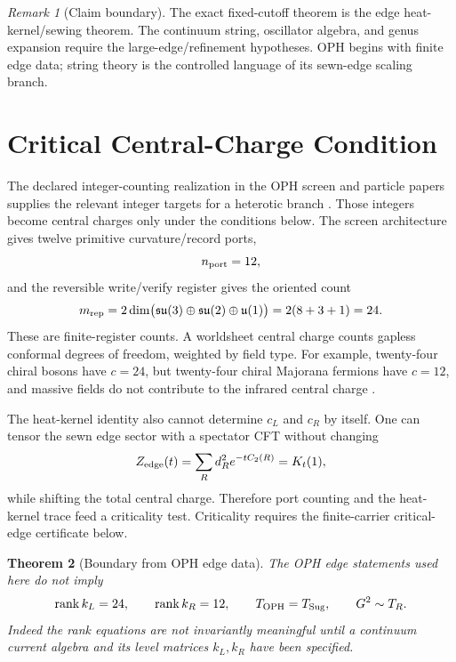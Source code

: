 \documentclass[11pt]{article}
\newtheorem{theorem}{Theorem}[section]
\theoremstyle{remark}
\newtheorem{remark}[theorem]{Remark}
\theoremstyle{plain}
\newcommand{\OPH}{\mathrm{OPH}}
\begin{document}
\begin{remark}[Claim boundary]
The exact fixed-cutoff theorem is the edge heat-kernel/sewing theorem. The continuum string,
oscillator algebra, and genus expansion require the large-edge/refinement hypotheses. OPH begins
with finite edge data; string theory is the controlled language of its sewn-edge scaling branch.
\end{remark}

\section{Critical Central-Charge Condition}\label{sec:central-charge-gate}

The declared integer-counting realization in the OPH screen and particle
papers supplies the relevant integer targets for a heterotic branch
\cite{OPHScreenMicrophysics,OPHParticleZoo}. Those integers become central
charges only under the conditions below. The screen architecture gives twelve primitive
curvature/record ports,
\[
n_{\rm port}=12,
\]
and the reversible write/verify register gives the oriented count
\[
m_{\rm rep}
=2\dim\bigl(\mathfrak{su}(3)\oplus\mathfrak{su}(2)\oplus\mathfrak u(1)\bigr)
=2(8+3+1)=24.
\]
These are finite-register counts. A worldsheet central charge counts gapless conformal degrees of
freedom, weighted by field type. For example, twenty-four chiral bosons have \(c=24\), but
twenty-four chiral Majorana fermions have \(c=12\), and massive fields do not contribute to the
infrared central charge \cite{PolchinskiStringVol1,DiFrancescoCFT}.

The heat-kernel identity also cannot determine \(c_L\) and \(c_R\) by itself. One can tensor the
sewn edge sector with a spectator CFT without changing
\[
Z_{\rm edge}(t)=\sum_R d_R^2e^{-tC_2(R)}=K_t(1),
\]
while shifting the total central charge. Therefore port counting and the heat-kernel trace feed a
criticality test. Criticality requires the finite-carrier critical-edge certificate below.

\begin{theorem}[Boundary from OPH edge data]
The OPH edge statements used here do not imply
\[
\operatorname{rank}k_L=24,\qquad
\operatorname{rank}k_R=12,\qquad
T_{\OPH}=T_{\rm Sug},\qquad
G^2\sim T_R.
\]
Indeed the rank equations are not invariantly meaningful until a continuum current algebra and its
level matrices \(k_L,k_R\) have been specified.
\end{theorem}
\end{document}

